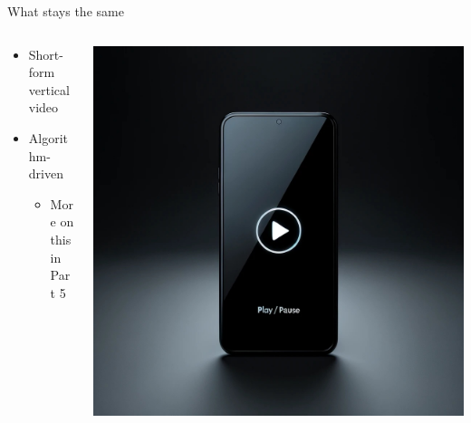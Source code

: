\documentclass[aspectratio=169]{beamer}
\begin{document}
\begin{frame}{What stays the same}
\begin{columns}[T]
    \begin{column}[T]{0.5\textwidth}
        \begin{itemize}
            \item Short-form vertical video
            \item Algorithm-driven
            \begin{itemize}
                \item More on this in Part 5
            \end{itemize}
        \end{itemize}
    \end{column}
    \begin{column}{0.5\textwidth}
        \includegraphics[height=0.8\textheight]{imgs/media/vertical_vid.jpeg}
    \end{column}
\end{columns}
\end{frame}
\end{document}
